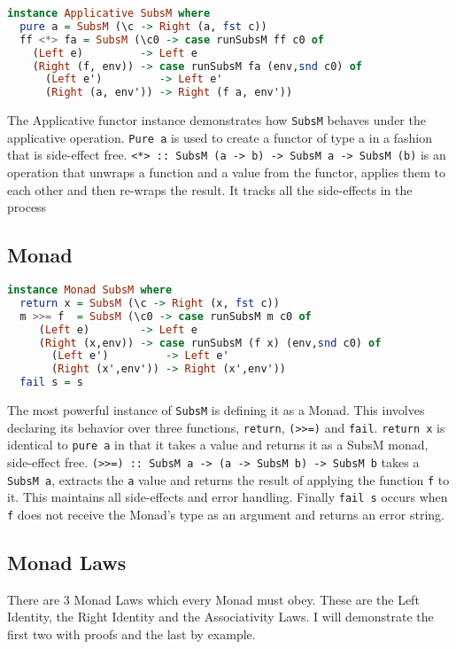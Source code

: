 \documentclass{article}
\begin{document}
\begin{lstlisting}[language=Haskell]
instance Applicative SubsM where
  pure a = SubsM (\c -> Right (a, fst c))
  ff <*> fa = SubsM (\c0 -> case runSubsM ff c0 of
    (Left e)         -> Left e
    (Right (f, env)) -> case runSubsM fa (env,snd c0) of
      (Left e')         -> Left e'
      (Right (a, env')) -> Right (f a, env'))
\end{lstlisting}

The Applicative functor instance demonstrates how \texttt{SubsM} behaves under the applicative operation. \texttt{Pure a} is used to create a functor of type a in a fashion that is side-effect free. \texttt{<*> :: SubsM (a -> b) -> SubsM a -> SubsM (b)} is an operation that unwraps a function and a value from the functor, applies them to each other and then re-wraps the result. It tracks all the side-effects in the process  

\subsection{Monad}
\begin{lstlisting}[language=Haskell]
instance Monad SubsM where
  return x = SubsM (\c -> Right (x, fst c))
  m >>= f  = SubsM (\c0 -> case runSubsM m c0 of
     (Left e)        -> Left e
     (Right (x,env)) -> case runSubsM (f x) (env,snd c0) of
       (Left e')         -> Left e'
       (Right (x',env')) -> Right (x',env'))
  fail s = s
\end{lstlisting}

The most powerful instance of \texttt{SubsM} is defining it as a Monad. This involves declaring its behavior over three functions, \texttt{return}, \texttt{(>>=)} and \texttt{fail}. \texttt{return x} is identical to \texttt{pure a} in that it takes a value and returns it as a SubsM monad, side-effect free. \texttt{(>>=) :: SubsM a -> (a -> SubsM b) -> SubsM b} takes a \texttt{SubsM a}, extracts the \texttt{a} value and returns the result of applying the function \texttt{f} to it. This maintains all side-effects and error handling. Finally \texttt{fail s} occurs when \texttt{f} does not receive the Monad's type as an argument and returns an error string.

\subsection{Monad Laws}

There are 3 Monad Laws which every Monad must obey. These are the Left Identity, the Right Identity and the Associativity Laws. I will demonstrate the first two with proofs and the last by example.
\end{document}
